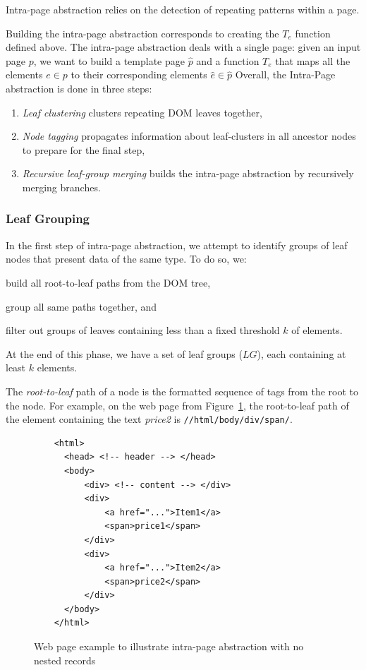 Intra-page abstraction relies on the detection of repeating patterns within a page. 

Building the intra-page abstraction corresponds to creating the $T_e$ function defined above.
The intra-page abstraction deals with a single page: given an input page $p$, we want to build a template page $\hat{p}$ and a function $T_e$ that maps all the elements $e \in p$  to their corresponding elements $\hat{e} \in \hat{p}$
Overall, the Intra-Page abstraction is done in three steps:
\begin{enumerate}
  \item \emph{Leaf clustering} clusters repeating DOM leaves together,
  \item \emph{Node tagging} propagates information about leaf-clusters in all ancestor nodes to prepare for the final step,
  \item \emph{Recursive leaf-group merging} builds the intra-page abstraction by recursively merging branches.
\end{enumerate}

\subsubsection{Leaf Grouping}
In the first step of intra-page abstraction, we attempt to identify groups of leaf nodes that present data of the same type.
To do so, we:
\begin{inparaenum}
  \item build all root-to-leaf paths from the DOM tree,
  \item group all same paths together, and
  \item filter out groups of leaves containing less than a fixed threshold $k$ of elements.
\end{inparaenum}
At the end of this phase, we have a set of leaf groups ($LG$), each containing at least $k$ elements.

The \emph{root-to-leaf} path of a node is the formatted sequence of tags from the root to the node.
For example, on the web page from Figure~\ref{fig:non_recursive_html}, the root-to-leaf path of the element containing the text \emph{price2} is \lstinline{//html/body/div/span/}.

\begin{figure}[ht]
  \centering
  \begin{lstlisting}
    <html>
      <head> <!-- header --> </head>
      <body>
          <div> <!-- content --> </div>
          <div>
              <a href="...">Item1</a>
              <span>price1</span>
          </div>
          <div>
              <a href="...">Item2</a>
              <span>price2</span>
          </div>
      </body>
    </html>
  \end{lstlisting}
  \caption{Web page example to illustrate intra-page abstraction with no nested records}
  \label{fig:non_recursive_html}
\end{figure}

